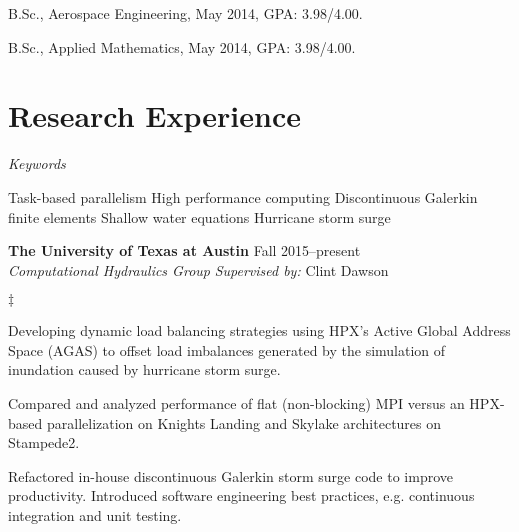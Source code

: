 \documentclass[margin,line]{res}
\newenvironment{list1}{
  \begin{list}{\ding{113}}{%
      \setlength{\itemsep}{0in}
      \setlength{\parsep}{0in} \setlength{\parskip}{0in}
      \setlength{\topsep}{0in} \setlength{\partopsep}{0in}
      \setlength{\leftmargin}{0.17in}}}{\end{list}}
\newenvironment{list2}{
  \begin{list}{$\ddagger$}{%
      \setlength{\itemsep}{0in}
      \setlength{\parsep}{0in} \setlength{\parskip}{0in}
      \setlength{\topsep}{0in} \setlength{\partopsep}{0in}
      \setlength{\leftmargin}{0.2in}}}{\end{list}}
\def\keywordgap{\hspace{2pt minus.5pt}}
\newcommand\keywordsep{\keywordgap\textbullet\keywordgap}
\begin{document}
\begin{resume}
\vspace*{-.1in}
\begin{list1}
\item[] B.Sc., Aerospace Engineering, May 2014, GPA: 3.98/4.00.
\item[] B.Sc., Applied Mathematics, May 2014, GPA: 3.98/4.00.
\end{list1}


\section{\sc Research Experience}
\textit{Keywords}
\vspace{0.05in}
\begin{list1}
\item[] Task-based parallelism \keywordsep High performance computing \keywordsep Discontinuous Galerkin finite elements \keywordsep Shallow water equations \keywordsep Hurricane storm surge
\end{list1}


\textbf{The University of Texas at Austin} \hfill Fall 2015--present\\
\textit{Computational Hydraulics Group}
\hfill {\it Supervised by:} Clint Dawson\\
\vspace{-0.1in}
\begin{list2}
\item Developing dynamic load balancing strategies using HPX's Active Global Address Space (AGAS) to offset load imbalances generated by the simulation of inundation caused by hurricane storm surge.
\item Compared and analyzed performance of flat (non-blocking) MPI versus an HPX-based parallelization on Knights Landing and Skylake architectures on Stampede2.
\item Refactored in-house discontinuous Galerkin storm surge code to improve productivity. Introduced software engineering best practices, e.g. continuous integration and unit testing.
\end{list2}


\end{resume}
\end{document}
